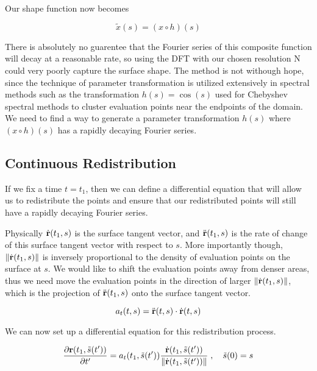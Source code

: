 Our shape function now becomes

\[ \tilde{x}(s) = (x \circ h)(s) \]

There is absolutely no guarentee that the Fourier series of this composite function will decay at a reasonable rate, so using the DFT with our chosen resolution N could very poorly capture the surface shape. The method is not withough hope, since the technique of parameter transformation is utilized extensively in spectral methods such as the transformation $h(s) = \cos(s)$ used for Chebyshev spectral methods to cluster evaluation points near the endpoints of the domain. We need to find a way to generate a parameter transformation $h(s)$ where $(x \circ h)(s)$ has a rapidly decaying Fourier series.

\subsection*{Continuous Redistribution}

If we fix a time $t = t_1$, then we can define a differential equation that will allow us to redistribute the points and ensure that our redistributed points will still have a rapidly decaying Fourier series.

Physically $\dot{\mathbf{r}}(t_1, s)$ is the surface tangent vector, and $\ddot{\mathbf{r}}(t_1, s)$ is the rate of change of this surface tangent vector with respect to $s$. More importantly though, $\norm{\dot{\bvec{r}}(t_1, s)}$ is inversely proportional to the density of evaluation points on the surface at $s$. We would like to shift the evaluation points away from denser areas, thus we need move the evaluation points in the direction of larger $\norm{\dot{\bvec{r}}(t_1, s)}$, which is the projection of $\ddot{\mathbf{r}}(t_1, s)$ onto the surface tangent vector.

\begin{equation}
  a_t(t, s) = \ddot{\mathbf{r}}(t, s) \cdot \dot{\mathbf{r}}(t, s)
\end{equation}


We can now set up a differential equation for this redistribution process.

\begin{equation}
  \label{eq:redist-diff-eq}
  \frac{\partial \bvec{r}(t_1, \tilde{s}(t'))}{\partial t'} = a_t(t_1, \tilde{s}(t')) \frac{\dot{\bvec{r}}(t_1, \tilde{s}(t'))}{\norm{\dot{\bvec{r}}(t_1, \tilde{s}(t'))}} \; , \quad \tilde{s}(0) = s
\end{equation}

